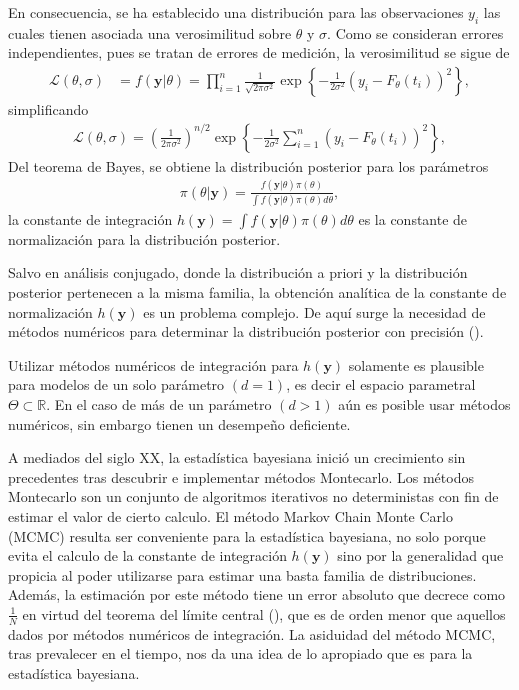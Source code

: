 En consecuencia, se ha establecido una distribución para las observaciones $y_i$ las cuales tienen asociada una verosimilitud sobre $\theta$ y $\sigma$. Como se consideran errores independientes, pues se tratan de errores de medición, la verosimilitud se sigue de
\begin{align*}
    \mathcal{L}(\theta,\sigma) &= f(\mathbf{y}|\theta) = \prod_{i = 1}^{n} \frac{1}{\sqrt{2\pi \sigma^2}} \exp \left \{ -\frac{1}{2\sigma^2}\left(y_i - F_{\theta}(t_i)\right)^2 \right \} , 
\end{align*}
simplificando
\begin{align*}
    \mathcal{L}(\theta,\sigma) = \left(\frac{1}{2\pi \sigma^2}\right) ^{n/2}\exp \left \{  -\frac{1}{2\sigma^2}\sum_{i = 1}^{n} \left(y_i - F_{\theta}(t_i)\right)^2 \right \},
\end{align*}
Del teorema de Bayes, se obtiene la distribución posterior para los parámetros
\begin{align}
    \pi(\theta| \mathbf{y})  = \frac{f(\mathbf{y}|\theta)\pi(\theta)}{\int f(\mathbf{y}|\theta)\pi(\theta)d \theta},
    \label{2.2.04}
\end{align}
la constante de integración $h(\mathbf{y}) = \int f(\mathbf{y}|\theta)\pi(\theta)d \theta$ es la constante de normalización para la distribución posterior. 

Salvo en análisis conjugado, donde la distribución a priori y la distribución posterior pertenecen a la misma familia, la obtención analítica de la constante de normalización $h(\mathbf{y})$ es un problema complejo. De aquí surge la necesidad de métodos numéricos para determinar la distribución posterior con precisión (\cite{robert1999monte}). 


Utilizar métodos numéricos de integración para $h(\mathbf{y})$ solamente es plausible para modelos de un solo parámetro $(d=1)$, es decir el espacio parametral $\Theta \subset \mathbb{R}$. En el caso de más de un parámetro $(d > 1)$ aún es posible usar métodos numéricos, sin embargo tienen un desempeño deficiente. 

A mediados del siglo XX, la estadística bayesiana inició un crecimiento sin precedentes tras descubrir e implementar métodos Montecarlo. Los métodos Montecarlo son un conjunto de algoritmos iterativos no deterministas con fin de estimar el valor de cierto calculo. El método Markov Chain Monte Carlo (MCMC) resulta ser conveniente para la estadística bayesiana, no solo porque evita el calculo de la constante de integración $h(\mathbf{y})$ sino por la generalidad que propicia al poder utilizarse para estimar una basta familia de distribuciones. Además, la estimación por este método tiene un error absoluto que decrece como $\frac{1}{N}$ en virtud del teorema del límite central (\cite{casella2024statistical}), que es de orden menor que aquellos dados por métodos numéricos de integración. La asiduidad del método MCMC, tras prevalecer en el tiempo, nos da una idea de lo apropiado que es para la estadística bayesiana.

